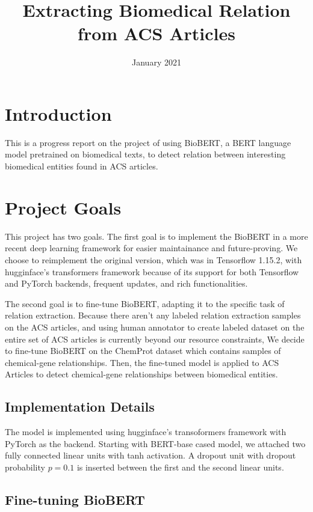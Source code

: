 \documentclass{article}
\title{Extracting Biomedical Relation from ACS Articles}
\date{January 2021}
\begin{document}
\maketitle

\section{Introduction}

This is a progress report on the project of using BioBERT, a BERT language model pretrained on biomedical texts, to
detect relation between interesting biomedical entities found in ACS articles.

\section{Project Goals} 

This project has two goals. The first goal is to implement the BioBERT in a more recent deep learning framework for
easier maintainance and future-proving. We choose to reimplement the original version, which was in Tensorflow
1.15.2, with hugginface's transformers framework because of its support for both Tensorflow and PyTorch backends,
frequent updates, and rich functionalities.

The second goal is to fine-tune BioBERT, adapting it to the specific task of relation extraction. Because there
aren't any labeled relation extraction samples on the ACS articles, and using human annotator to create labeled
dataset on the entire set of ACS articles is currently beyond our resource constraints, We decide to fine-tune
BioBERT on the ChemProt dataset which contains samples of chemical-gene relationships. Then, the fine-tuned model is
applied to ACS Articles to detect chemical-gene relationships between biomedical entities.

\subsection{Implementation Details}

The model is implemented using hugginface's transoformers framework with PyTorch as the backend. Starting with
BERT-base cased model, we attached two fully connected linear units with tanh activation. A dropout unit with dropout
probability $p=0.1$ is inserted between the first and the second linear units.

\subsection{Fine-tuning BioBERT}
\end{document}
